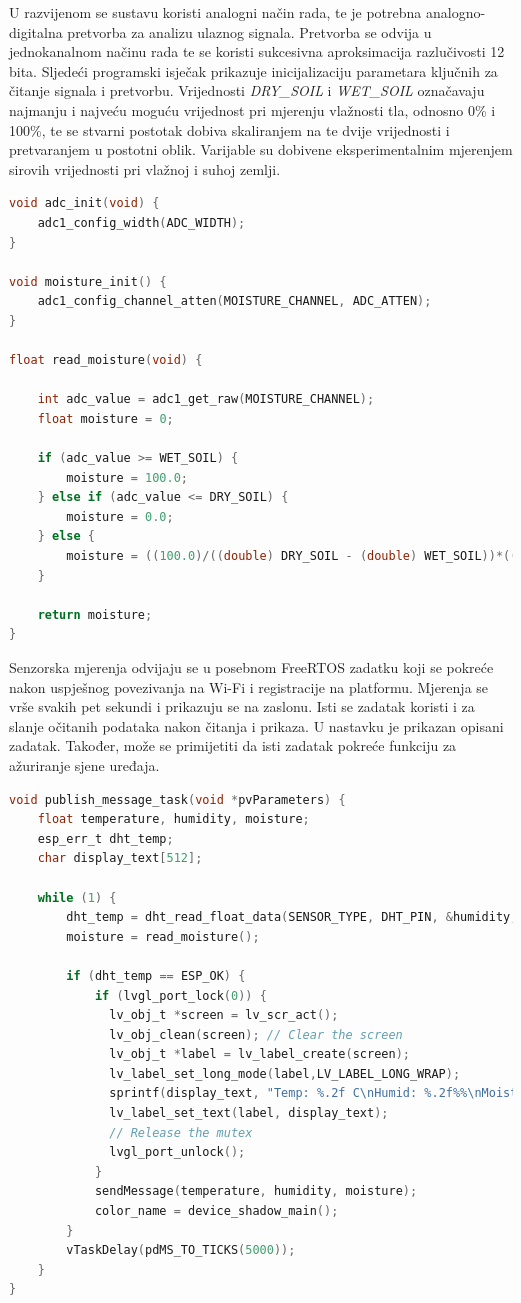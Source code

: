 U razvijenom se sustavu koristi analogni način rada, te je potrebna analogno-digitalna pretvorba za analizu ulaznog signala. Pretvorba se odvija u jednokanalnom načinu rada te se koristi sukcesivna aproksimacija razlučivosti 12 bita. Sljedeći programski isječak prikazuje inicijalizaciju parametara ključnih za čitanje signala i pretvorbu. Vrijednosti \textit{DRY\_SOIL} i \textit{WET\_SOIL} označavaju najmanju i najveću moguću vrijednost pri mjerenju vlažnosti tla, odnosno 0\% i 100\%, te se stvarni postotak dobiva skaliranjem na te dvije vrijednosti i pretvaranjem u postotni oblik. Varijable su dobivene eksperimentalnim mjerenjem sirovih vrijednosti pri vlažnoj i suhoj zemlji. 

\begin{lstlisting}[caption={}, language=c]
void adc_init(void) {
	adc1_config_width(ADC_WIDTH);
}

void moisture_init() {
	adc1_config_channel_atten(MOISTURE_CHANNEL, ADC_ATTEN);
}

float read_moisture(void) {
	
	int adc_value = adc1_get_raw(MOISTURE_CHANNEL);
	float moisture = 0;
	
	if (adc_value >= WET_SOIL) {
		moisture = 100.0;
	} else if (adc_value <= DRY_SOIL) {
		moisture = 0.0;
	} else {
		moisture = ((100.0)/((double) DRY_SOIL - (double) WET_SOIL))*((double) (adc_value) - (double) WET_SOIL);
	}
	
	return moisture;
}
\end{lstlisting}

Senzorska mjerenja odvijaju se u posebnom FreeRTOS zadatku koji se pokreće nakon uspješnog povezivanja na Wi-Fi i registracije na platformu. Mjerenja se vrše svakih pet sekundi i prikazuju se na zaslonu. Isti se zadatak koristi i za slanje očitanih podataka nakon čitanja i prikaza. U nastavku je prikazan opisani zadatak. Također, može se primijetiti da isti zadatak pokreće funkciju za ažuriranje sjene uređaja. 

\begin{lstlisting}[caption={FreeRTOS zadatak za očitanje senzorskih mjerenja i slanje podataka}, language=c]
void publish_message_task(void *pvParameters) {
	float temperature, humidity, moisture;
	esp_err_t dht_temp;
	char display_text[512];
	
	while (1) {
		dht_temp = dht_read_float_data(SENSOR_TYPE, DHT_PIN, &humidity, &temperature) != ESP_OK;
		moisture = read_moisture();
		
		if (dht_temp == ESP_OK) {
			if (lvgl_port_lock(0)) {
			  lv_obj_t *screen = lv_scr_act();
			  lv_obj_clean(screen); // Clear the screen
			  lv_obj_t *label = lv_label_create(screen);
			  lv_label_set_long_mode(label,LV_LABEL_LONG_WRAP);
			  sprintf(display_text, "Temp: %.2f C\nHumid: %.2f%%\nMoist: %.2f%%", temperature, humidity, moisture);
			  lv_label_set_text(label, display_text);
			  // Release the mutex
			  lvgl_port_unlock();
			}
			sendMessage(temperature, humidity, moisture);
			color_name = device_shadow_main();
		}
		vTaskDelay(pdMS_TO_TICKS(5000));
	}
}
\end{lstlisting}

